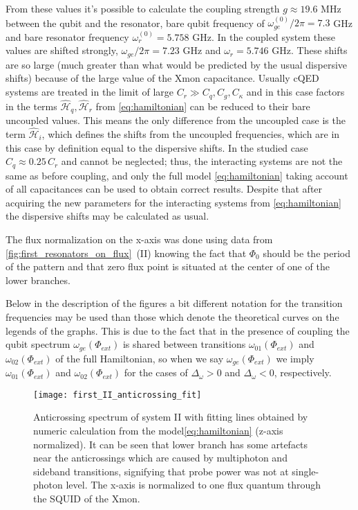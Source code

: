 \documentclass[12pt, twoside]{report}
\numberwithin{equation}{section}
\begin{document}
From these values it's possible to calculate the coupling strength $g \approx 19.6$ MHz between the qubit and the resonator, bare qubit frequency of $\omega^{(0)}_{ge}/2\pi = 7.3$ GHz and bare resonator frequency $\omega^{(0)}_r = 5.758$ GHz. In the coupled system these values are shifted strongly, $\omega_{ge}/2\pi = 7.23$ GHz and $\omega_r = 5.746$ GHz. These shifts are so large (much greater than what would be predicted by the usual dispersive shifts) because of the large value of the Xmon capacitance. Usually cQED systems are treated in the limit of large $C_r \gg C_q, C_g, C_\kappa$ and in this case factors in the terms $\mathcal{\hat H}_q, \mathcal{\hat H}_r $ from \eqref{eq:hamiltonian} can be reduced to their bare uncoupled values. This means the only difference from the uncoupled case is the term $\mathcal{\hat H}_i$, which defines the shifts from the uncoupled frequencies, which are in this case by definition equal to the dispersive shifts. In the studied case $C_q \approx 0.25\, C_r$ and cannot be neglected; thus, the interacting systems are not the same as before coupling, and only the full model \eqref{eq:hamiltonian} taking account of all capacitances can be used to obtain correct results. Despite that after acquiring the new parameters for the interacting systems from \eqref{eq:hamiltonian} the dispersive shifts may be calculated as usual.

The flux normalization on the x-axis was done using data from \autoref{fig:first_resonators_on_flux}~(II) knowing the fact that $\Phi_0$ should be the period of the pattern and that zero flux point is situated at the center of one of the lower branches.

Below in the description of the figures a bit different notation for the transition frequencies may be used than those which denote the theoretical curves on the legends of the graphs. This is due to the fact that in the presence of coupling the qubit spectrum $\omega_{ge}(\Phi_{ext})$ is shared between transitions $\omega_{01}(\Phi_{ext})$ and $\omega_{02}(\Phi_{ext})$ of the full Hamiltonian, so when we say $\omega_{ge}(\Phi_{ext})$ we imply $\omega_{01}(\Phi_{ext})$ and $\omega_{02}(\Phi_{ext})$ for the cases of $\Delta_\omega > 0 $ and $\Delta_\omega < 0$, respectively.

\begin{figure}
\centering
\texttt{[image: first\_II\_anticrossing\_fit]}
\caption{Anticrossing spectrum of system II with fitting lines obtained by numeric calculation from the model\eqref{eq:hamiltonian} (z-axis normalized). It can be seen that lower branch has some artefacts near the anticrossings which are caused by multiphoton and sideband transitions, signifying that probe power was not at single-photon level. The x-axis is normalized to one flux quantum through the SQUID of the Xmon.}
\label{fig:first_2nd_res_anticrossing}
\end{figure} 
\end{document}
